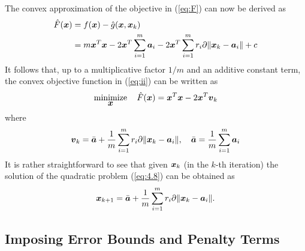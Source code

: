 The convex approximation of the objective in (\ref{eq:F}) can now be derived as 
\begin{equation}
\nonumber
\begin{aligned}
\hat{F}(\mbox{\boldmath$x$}) & =  f(\mbox{\boldmath$x$}) - \hat{g}(\mbox{\boldmath$x$}, \mbox{\boldmath$x$}_k) \\
& =  m \mbox{\boldmath$x$}^T\mbox{\boldmath$x$} - 2 \mbox{\boldmath$x$}^T\sum^m_{i=1} \mbox{\boldmath$a$}_i - 2\mbox{\boldmath$x$}^T \sum^m_{i=1} r_i \partial \|\mbox{\boldmath$x$}_k - \mbox{\boldmath$a$}_i \| + c
\end{aligned}
\end{equation} 
It follows that, up to a multiplicative factor $1/m$ and an additive constant term, the convex objective function in (\ref{eq:ii}) can  be written as 
\begin{equation} \label{eq:4.8} 
\mathop{\mbox{minimize}}_{\mbox{\boldmath$x$}} \quad \hat{F}(\mbox{\boldmath$x$}) = \mbox{\boldmath$x$}^T\mbox{\boldmath$x$} - 2\mbox{\boldmath$x$}^T {\mbox{\boldmath$v$}}_k
\end{equation}
where
\begin{equation} \label{eq:4.9} 
\begin{aligned}
\mbox{\boldmath$v$}_k  = \bar{\mbox{\boldmath$a$}} + \frac{1}{m} \sum^m_{i=1} r_i \partial \|\mbox{\boldmath$x$}_k - \mbox{\boldmath$a$}_i\| , \quad \bar{\mbox{\boldmath$a$}} = \frac{1}{m}  \sum^m_{i = 1} \mbox{\boldmath$a$}_i 
\end{aligned}
\end{equation}
It is rather straightforward to see that given $\mbox{\boldmath$x$}_k$ (in the $k$-th iteration) the solution of the quadratic problem (\ref{eq:4.8}) can be obtained as
\begin{equation} \label{eq:4.10} 
\mbox{\boldmath$x$}_{k+1} = \bar{\mbox{\boldmath$a$}} + \frac{1}{m} \sum^m_{i=1} r_i \partial \|\mbox{\boldmath$x$}_k - \mbox{\boldmath$a$}_i\|.
\end{equation}
%
%
%	
\subsection{Imposing Error Bounds and Penalty Terms }

